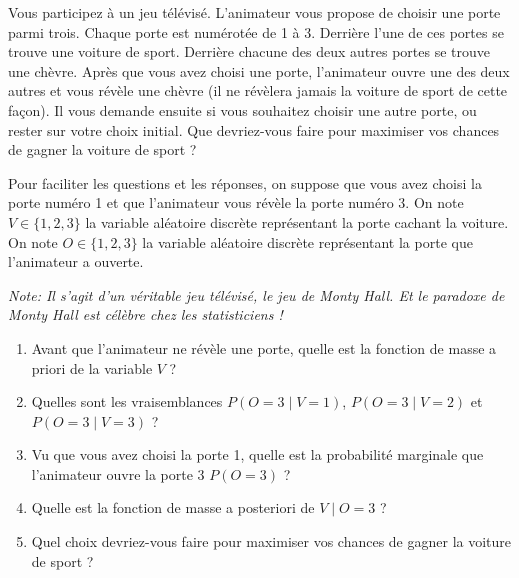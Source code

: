 \documentclass[solutions]{../exercices}
\begin{document}


	\begin{exercice}
		Vous participez à un jeu télévisé. L'animateur vous propose de choisir une porte parmi trois. Chaque porte est numérotée de 1 à 3. Derrière l'une de ces portes se trouve une voiture de sport. Derrière chacune des deux autres portes se trouve une chèvre. Après que vous avez choisi une porte, l'animateur ouvre une des deux autres et vous révèle une chèvre (il ne révèlera jamais la voiture de sport de cette façon). Il vous demande ensuite si vous souhaitez choisir une autre porte, ou rester sur votre choix initial. Que devriez-vous faire pour maximiser vos chances de gagner la voiture de sport ?

		Pour faciliter les questions et les réponses, on suppose que vous avez choisi la porte numéro 1 et que l'animateur vous révèle la porte numéro 3. On note $V \in \{1, 2, 3\}$ la variable aléatoire discrète représentant la porte cachant la voiture. On note $O \in \{1, 2, 3\}$ la variable aléatoire discrète représentant la porte que l'animateur a ouverte.

		\vspace{0.3cm}
		\textit{Note: Il s'agit d'un véritable jeu télévisé, le jeu de Monty Hall. Et le paradoxe de Monty Hall est célèbre chez les statisticiens !}

		\begin{enumerate}
			\item Avant que l'animateur ne révèle une porte, quelle est la fonction de masse a priori de la variable $V$ ?
			\item Quelles sont les vraisemblances $P(O=3 \mid V=1)$,  $P(O=3 \mid V=2)$ et $P(O=3 \mid V=3)$ ?
			\item Vu que vous avez choisi la porte 1, quelle est la probabilité marginale que l'animateur ouvre la porte 3 $P(O=3)$ ?
			\item Quelle est la fonction de masse a posteriori de $V \mid O=3$ ?
			\item Quel choix devriez-vous faire pour maximiser vos chances de gagner la voiture de sport ?
		\end{enumerate}

	\end{exercice}
\end{document}

